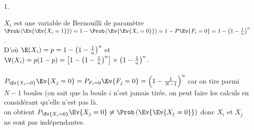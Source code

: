 \documentclass[11pt]{article}%
\begin{document}
\begin{exercice}
\begin{noliste}{1.}
 \item $X_{i}$ est une variable de Bernouilli de paramètre
$\Prob\left(\Ev{\Ev{ X_{i} = 1}}\right) = 1 - \Prob\left(\Ev{\Ev{ X_{i}
= 0}}\right) = 1 - P \Ev{ F_{i} = 0} = 1 - \left( 1 - \frac{1}{n}
\right)^{n}$. \\
 D'où $\E(X_{i}) = p = 1 - \left( 1 - \frac{1}{n} \right)^{n}$ et
$\V(X_{i}) = p (1-p) = \left[1 - \left( 1 - \frac{1}{n} \right)^{n}
\right] \times \left( 1 - \frac{1}{n} \right)^{n}$. \\
\\
 $P_{\Ev{X_{i} = 0}} \Ev{X_{j} = 0} = P_{F_{i} = 0} \Ev{F_{j} = 0} =
\left( 1 - \frac{1}{N-1} \right)^{n}$ car on tire parmi $N-1$ boules
(on sait que la boule $i$ n'est jamais tirée, on peut faire les calculs
en considérant qu'elle n'est pas là. \\
 on obtient $P_{\Ev{X_{i} = 0}} \Ev{X_{j} = 0} \neq \Prob\left(\Ev{\Ev{
X_{j} = 0}}\right)$ donc $X_{i}$ et $X_{j}$ ne sont pas indépendantes.
 \end{noliste}
 \end{exercice}

 \newpage
\end{document}
